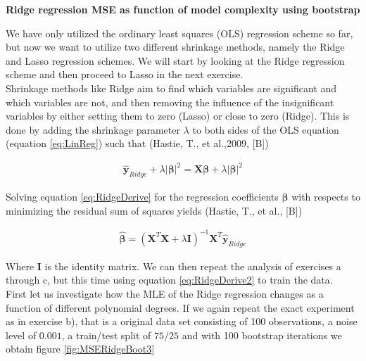 \documentclass[12pt,a4paper]{article}
\begin{document}
\begin{center}
\large{\textbf{Ridge regression MSE as function of model complexity using bootstrap}}
\end{center}

\noindent We have only utilized the ordinary least squares (OLS) regression scheme so far, but now we want to utilize two different shrinkage methods, namely the Ridge and Lasso regression schemes. We will start by looking at the Ridge regression scheme and then proceed to Lasso in the next exercise. 
\\
Shrinkage methods like Ridge aim to find which variables are significant and which variables are not, and then removing the influence of the insignificant variables by either setting them to zero (Lasso) or close to zero (Ridge). This is done by adding the shrinkage parameter $\lambda$ to both sides of the OLS equation (equation \ref{eq:LinReg}) such that (Hastie, T., et al.,2009, [B])

\begin{equation}\label{eq:RidgeDerive}
\begin{aligned}
\boldsymbol{\hat{y}}_{Ridge} + \lambda |\boldsymbol{\beta}|^2 = \textbf{X}\boldsymbol{\beta} + \lambda  |\boldsymbol{\beta}|^2
\end{aligned}
\end{equation}

\noindent Solving equation \ref{eq:RidgeDerive} for the regression coefficients $\boldsymbol{\beta}$ with respects to minimizing the residual sum of squares yields (Hastie, T., et al., [B])

\begin{equation}\label{eq:RidgeDerive2}
\begin{aligned}
\boldsymbol{\hat{\beta}} = (\textbf{X}^T \textbf{X} + \lambda \textbf{I})^{-1} \textbf{X}^T \boldsymbol{\hat{y}}_{Ridge}
\end{aligned}
\end{equation}

\noindent Where $\textbf{I}$ is the identity matrix. We can then repeat the analysis of exercises a through c, but this time using equation \ref{eq:RidgeDerive2} to train the data. 
\\
First let us investigate how the MLE of the Ridge regression changes as a function of different polynomial degrees. If we again repeat the exact experiment as in exercise b), that is a original data set consisting of 100 observations, a noise level of $0.001$, a train/test split of $75/25$ and with 100 bootstrap iterations we obtain figure \ref{fig:MSERidgeBoot3}
\end{document}
